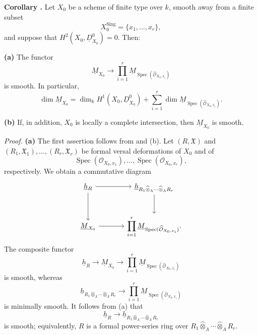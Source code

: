 \medskip
\noindent\textbf{Corollary .}
Let $X_0$ be a scheme of finite type over $k$, smooth away from a
finite subset
\[
X_0^{\mathrm{Sing}}=\{x_1,\ldots,x_r\},
\]
and suppose that $H^2(X_0,\underline D^0_{X_0})=0$. Then:

\smallskip
\noindent\textbf{(a)} The functor
\[
\underline M_{X_0}\longrightarrow
\prod_{i=1}^r
\underline M_{\operatorname{Spec}(\widehat{\mathcal O}_{X_0,x_i})}
\]
is smooth. In particular,
\[
\dim\underline M_{X_0}
=\dim_k H^1(X_0,\underline D^0_{X_0})
+\sum_{i=1}^r
\dim\underline M_{\operatorname{Spec}(\widehat{\mathcal O}_{X_0,x_i})}.
\]

\smallskip
\noindent\textbf{(b)} If, in addition, $X_0$ is locally a complete
intersection, then $\underline M_{X_0}$ is smooth.


\smallskip
\noindent\textit{Proof.}
\textbf{(a)} The first assertion follows from  and (b).
Let $(R,\mathfrak X)$ and
$(R_1,\mathfrak X_1),\ldots,(R_r,\mathfrak X_r)$ be formal versal
deformations of $X_0$ and of
\[
\operatorname{Spec}(\mathcal O_{X_0,x_1}),\ldots,
\operatorname{Spec}(\mathcal O_{X_0,x_r}),
\]
respectively. We obtain a commutative diagram
\[
\begin{tikzcd}[column sep=large,row sep=large]
\underline h_R
  \arrow[r]
  \arrow[d]
& \underline h_{R_1\widehat\otimes_\Lambda\cdots
  \widehat\otimes_\Lambda R_r}
  \arrow[d] \\
\underline M_{X_0}
  \arrow[r]
& \displaystyle\prod_{i=1}^r
  \underline M_{\operatorname{Spec}(\widehat{\mathcal O}_{X_0,x_i})}.
\end{tikzcd}
\]
The composite functor
\[
\underline h_R\longrightarrow\underline M_{X_0}
\longrightarrow
\prod_{i=1}^r
\underline M_{\operatorname{Spec}(\widehat{\mathcal O}_{X_0,x_i})}
\]
is smooth, whereas
\[
\underline h_{R_1\widehat\otimes_\Lambda\cdots
\widehat\otimes_\Lambda R_r}
\longrightarrow
\prod_{i=1}^r
\underline M_{\operatorname{Spec}(\widehat{\mathcal O}_{X_0,x_i})}
\]
is minimally smooth. It follows from (a) that
\[
\underline h_R\longrightarrow
\underline h_{R_1\widehat\otimes_\Lambda\cdots
\widehat\otimes_\Lambda R_r}
\]
is smooth; equivalently, $R$ is a formal power-series ring over
$R_1\widehat\otimes_\Lambda\cdots\widehat\otimes_\Lambda R_r$.

